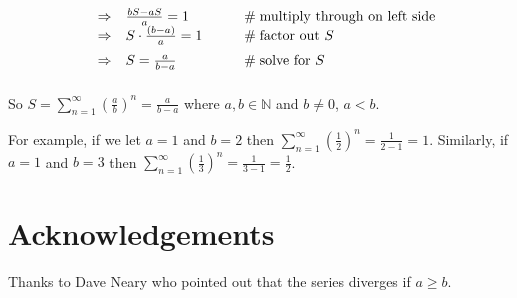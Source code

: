 \documentclass[11pt, oneside]{article}   	%
\begin{document}
\begin{equation*}
\begin{array}{lllll}
&\Rightarrow& \frac{bS - aS}{a} = 1                                                                                                                            &\qquad  \mathrel{\#} \text{multiply through on left side}                 \\
\vspace{2.0mm}
&\Rightarrow& S \cdot \frac{(b - a)} {a} = 1                                                                                                                 &\qquad  \mathrel{\#} \text{factor out $S$}                                       \\
\vspace{2.0mm}
&\Rightarrow& S  = \frac{a}{b - a}                                                                                                                               &\qquad  \mathrel{\#} \text{solve for $S$}
\end{array}
\end{equation*}

\bigskip
\noindent
So $S = \sum\limits_{n = 1}^\infty (\frac{a}{b})^n  =  \frac{a}{b -a}$ where $a,b \in \mathbb{N}$ and $b \neq 0$, $a < b$.  

\bigskip
\noindent
For example, if we  let $a =1$ and $b =2$ then $\sum\limits_{n = 1}^\infty (\frac{1}{2})^n  =  \frac{1}{2-1} = 1$. Similarly, if $a =1$ and $b = 3$ then 
$\sum\limits_{n = 1}^\infty (\frac{1}{3})^n  =  \frac{1}{3-1} = \frac{1}{2}$. 

\bigskip
\noindent
\section*{Acknowledgements}

Thanks to Dave Neary who pointed out that the series diverges if $a \geq b$.
\end{document}
